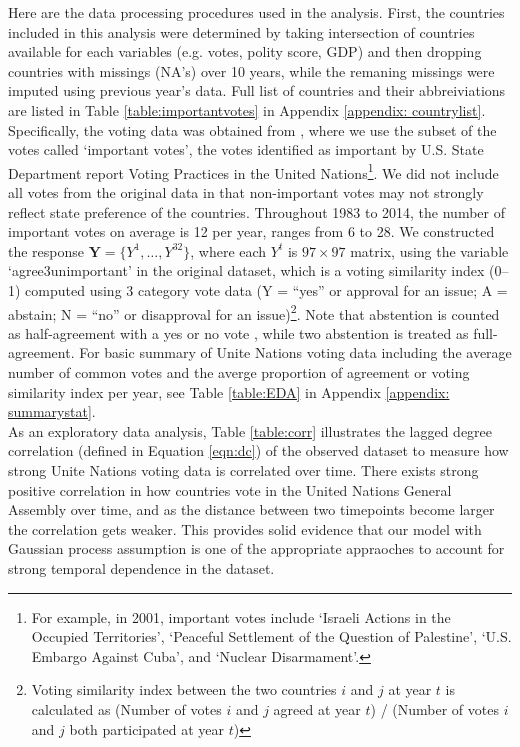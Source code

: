 \documentclass[a4paper]{article}
\begin{document}
Here are the data processing procedures used in the analysis. First, the countries included in this analysis were determined by taking intersection of countries available for each variables (e.g. votes, polity score, GDP) and then dropping countries with missings (NA's) over 10 years, while the remaning missings were imputed using previous year's data. Full list of countries and their abbreiviations are listed in Table \ref{table:importantvotes} in Appendix \ref{appendix: countrylist}. Specifically, the voting data was obtained from \cite{12379_2016}, where we use the subset of the votes called `important votes', the votes identified as important by U.S. State Department report Voting Practices in the United Nations\footnote{For example, in 2001, important votes include `Israeli Actions in the Occupied Territories', `Peaceful Settlement of the Question of Palestine', `U.S. Embargo Against Cuba', and `Nuclear Disarmament'.}. We did not include all votes from the original data in that non-important votes may not strongly reflect state preference of the countries. Throughout 1983 to 2014, the number of important votes on average is 12 per year, ranges from 6 to 28. We constructed the response $\mathbf{Y} = \{Y^1,\ldots, Y^{32}\}$, where each $Y^t$ is $97\times 97$ matrix, using the variable `agree3unimportant' in the original dataset, which is a voting similarity index (0--1) computed using 3 category vote data (Y = “yes” or approval for an issue; A = abstain; N = “no” or disapproval for an issue)\footnote{Voting similarity index between the two countries $i$ and $j$ at year $t$ is calculated as (Number of votes $i$ and $j$ agreed at year $t$) / (Number of votes $i$ and $j$ both participated at year $t$)}. Note that abstention is counted as half-agreement with a yes or no vote \citep*{12379_2016}, while two abstention is treated as full-agreement. For basic summary of Unite Nations voting data including the average number of common votes and the averge proportion of agreement or voting similarity index per year, see Table \ref{table:EDA} in Appendix \ref{appendix: summarystat}. \\ \newline
As an exploratory data analysis, Table \ref{table:corr} illustrates the lagged degree correlation (defined in Equation \ref{eqn:dc}) of the observed dataset to measure how strong Unite Nations voting data is correlated over time. There exists strong positive correlation in how countries vote in the United Nations General Assembly over time, and as the distance between two timepoints become larger the correlation gets weaker. This provides solid evidence that our model with Gaussian process assumption is one of the appropriate appraoches to account for strong temporal dependence in the dataset.
\end{document}

